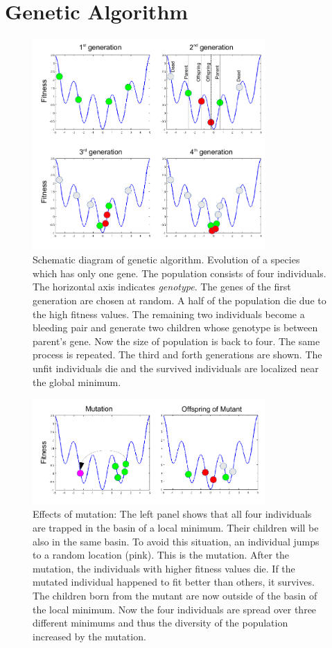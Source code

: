 \noindent
\section{Genetic Algorithm}

\begin{figure}
\centering
\includegraphics[width=3.5in]{19.Optimization/ga-diagram1.pdf}
\caption{Schematic diagram of genetic algorithm. Evolution of a species which has only one gene. The population consists of four individuals. The horizontal axis indicates \textit{genotype}. The genes of the first generation are chosen at random.  A half of the population die due to the high fitness values. The remaining two individuals become a bleeding pair and generate two children whose genotype is between parent's gene.  Now the size of population is back to four. The same process is repeated.  The third and forth generations are shown. The unfit individuals die and the survived individuals are localized near the global minimum.}
\label{fig:ga_diagram1}
\end{figure}
\begin{figure}
\centering
\includegraphics[width=3.5in]{19.Optimization/ga-diagram2.pdf}
\caption{Effects of mutation:  The left panel shows that all four individuals are trapped in the basin of a local minimum. Their children will be also in the same basin. To avoid this situation, an individual jumps to a random location (pink). This is the mutation.  After the mutation, the individuals with higher fitness values die.  If the mutated individual happened to fit better than others, it survives.  The children born from the mutant are now outside of the basin of the local minimum.  Now the four individuals are spread over three different minimums and thus the diversity of the population increased by the mutation.}
\label{fig:ga_diagram2}
\end{figure}

